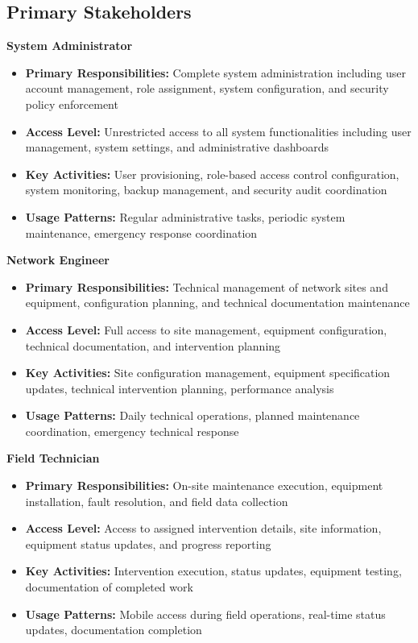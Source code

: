 \subsection{Primary Stakeholders}

\textbf{System Administrator}
\begin{itemize}
\item \textbf{Primary Responsibilities:} Complete system administration including user account management, role assignment, system configuration, and security policy enforcement
\item \textbf{Access Level:} Unrestricted access to all system functionalities including user management, system settings, and administrative dashboards
\item \textbf{Key Activities:} User provisioning, role-based access control configuration, system monitoring, backup management, and security audit coordination
\item \textbf{Usage Patterns:} Regular administrative tasks, periodic system maintenance, emergency response coordination
\end{itemize}

\textbf{Network Engineer}
\begin{itemize}
\item \textbf{Primary Responsibilities:} Technical management of network sites and equipment, configuration planning, and technical documentation maintenance
\item \textbf{Access Level:} Full access to site management, equipment configuration, technical documentation, and intervention planning
\item \textbf{Key Activities:} Site configuration management, equipment specification updates, technical intervention planning, performance analysis
\item \textbf{Usage Patterns:} Daily technical operations, planned maintenance coordination, emergency technical response
\end{itemize}

\textbf{Field Technician}
\begin{itemize}
\item \textbf{Primary Responsibilities:} On-site maintenance execution, equipment installation, fault resolution, and field data collection
\item \textbf{Access Level:} Access to assigned intervention details, site information, equipment status updates, and progress reporting
\item \textbf{Key Activities:} Intervention execution, status updates, equipment testing, documentation of completed work
\item \textbf{Usage Patterns:} Mobile access during field operations, real-time status updates, documentation completion
\end{itemize}

